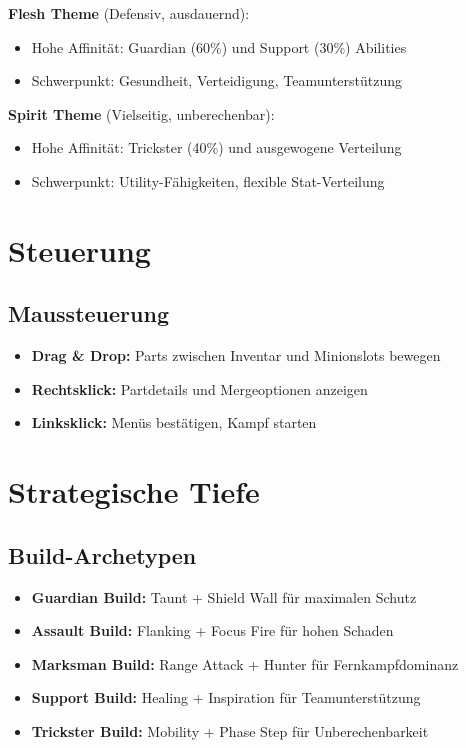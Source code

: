 \textbf{Flesh Theme} (Defensiv, ausdauernd):
\begin{itemize}
    \item Hohe Affinität: Guardian (60\%) und Support (30\%) Abilities  
    \item Schwerpunkt: Gesundheit, Verteidigung, Teamunterstützung
\end{itemize}

\textbf{Spirit Theme} (Vielseitig, unberechenbar):
\begin{itemize}
    \item Hohe Affinität: Trickster (40\%) und ausgewogene Verteilung
    \item Schwerpunkt: Utility-Fähigkeiten, flexible Stat-Verteilung
\end{itemize}

\section{Steuerung}

\subsection{Maussteuerung}
\begin{itemize}
    \item \textbf{Drag \& Drop:} Parts zwischen Inventar und Minionslots bewegen
    \item \textbf{Rechtsklick:} Partdetails und Mergeoptionen anzeigen
    \item \textbf{Linksklick:} Menüs bestätigen, Kampf starten
\end{itemize}

\section{Strategische Tiefe}

\subsection{Build-Archetypen}
\begin{itemize}
    \item \textbf{Guardian Build:} Taunt + Shield Wall für maximalen Schutz
    \item \textbf{Assault Build:} Flanking + Focus Fire für hohen Schaden
    \item \textbf{Marksman Build:} Range Attack + Hunter für Fernkampfdominanz
    \item \textbf{Support Build:} Healing + Inspiration für Teamunterstützung
    \item \textbf{Trickster Build:} Mobility + Phase Step für Unberechenbarkeit
\end{itemize}

